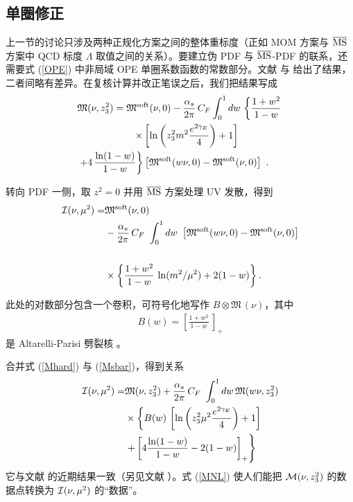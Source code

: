 \subsection{单圈修正}

上一节的讨论只涉及两种正规化方案之间的整体重标度（正如 MOM 方案与 $\overline{\rm MS}$ 方案中 QCD 标度 $\Lambda$ 取值之间的关系）。要建立伪 PDF 与 $\overline{\rm MS}$-PDF 的联系，还需要式 \mbox{(\ref{OPE})} 中非局域 OPE 单圈系数函数的常数部分。文献 \cite{Ji:2017rah} 与 \cite{Radyushkin:2017lvu} 给出了结果，二者间略有差异。在复核计算并改正笔误之后，我们把结果写成
  \begin{align}
  &
{\mathfrak M}  (\nu, z_3^2)    = {\mathfrak  M}^{\rm soft}  ( \nu, 0)  -  \frac{\alpha_s}{2\pi} \, C_F
\int_0^1  dw \,  \left \{   \frac{1+w^2} {1-w}    \right.  \nonumber \\  & \left.  \hspace{2cm} \times
  \left [  \ln \left (z_3^2m^2\frac{  e^{2\gamma_E}}{4} \right )   +1 \right ]
\right. \nonumber \\     & \left.
+ 4  \,  \frac{\ln (1-w)}{1-w}
\right \}  \left [
{\mathfrak  M}^{\rm soft}  (w \nu,0) -  {\mathfrak  M}^{\rm soft}  ( \nu,0) \right ]\  .
 \label{Mhard}
 \end{align}

转向 PDF 一侧，取 $z^2=0$ 并用 $\overline{\rm MS}$ 方案处理 UV 发散，得到
   \begin{align}
{\cal I}  (\nu, \mu^2)
  =&  {\mathfrak  M}^{\rm soft}  ( \nu, 0) \nonumber \\  & -  \frac{\alpha_s}{2\pi} \, C_F\
    \int_0^1  dw \
  \left [
{\mathfrak  M}^{\rm soft}  (w \nu, 0) -  {\mathfrak  M}^{\rm soft}  ( \nu, 0) \right ]\nonumber \\  &
  \nonumber \\  & \times \left \{    \frac{1+w^2} {1-w} \,  \ln (m^2/ \mu^2)   + 2 (1-w) \right \}
.
\label{Msbar}
 \end{align}

此处的对数部分包含一个卷积，可符号化地写作 $B \otimes {\mathfrak M}\,  (\nu)$，其中
     \begin{align}
B(w) =
\left [ \frac{1+w^2}{1- w} \, \right ]_+
\label{AP}
 \end{align}
是 Altarelli-Parisi 劈裂核 \cite{Altarelli:1977zs}。

合并式 (\ref {Mhard}) 与 (\ref{Msbar})，得到关系
  \begin{align}
{\cal I}  (\nu, \mu^2)    = & {\mathfrak  M} ( \nu, z_3^2) +  \frac{\alpha_s}{2\pi} \, C_F\
 \int_0^1  dw \,   {\mathfrak  M}  (w \nu,z_3^2)   \nonumber \\  &
 \times  \left  \{   B(w) \, \left [ \ln \left (z_3^2\mu^2 \frac{  e^{2\gamma_E}}{4} \right )  +1
 \right ]   \right. \nonumber \\  & \left.
+   \left [ 4  \frac{\ln (1-w)}{1-w} - 2 (1-w)  \right ]_+ \right  \}
\
\label{MNL}
 \end{align}
它与文献 \cite{Izubuchi:2018srq} 的近期结果一致（另见文献 \cite{Zhang:2018ggy}）。式 (\ref{MNL}) 使人们能把 ${\cal  M} ( \nu, z_3^2) $ 的数据点转换为 ${\cal  I} (\nu, \mu^2)$ 的``数据''。

